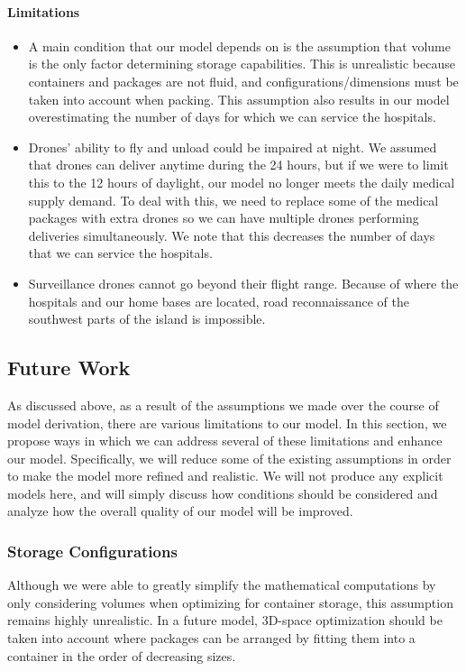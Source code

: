 \paragraph{Limitations}
\begin{itemize}
    \item A main condition that our model depends on is the assumption that volume is the only factor determining storage capabilities. This is unrealistic because containers and packages are not fluid, and configurations/dimensions must be taken into account when packing. This assumption also results in our model overestimating the number of days for which we can service the hospitals. 
    \item Drones' ability to fly and unload could be impaired at night. We assumed that drones can deliver anytime during the 24 hours, but if we were to limit this to the 12 hours of daylight, our model no longer meets the daily medical supply demand. To deal with this, we need to replace some of the medical packages with extra drones so we can have multiple drones performing deliveries simultaneously. We note that this decreases the number of days that we can service the hospitals. 
    \item Surveillance drones cannot go beyond their flight range. Because of where the hospitals and our home bases are located, road reconnaissance of the southwest parts of the island is impossible. 
\end{itemize}


\subsection{Future Work}
As discussed above, as a result of the assumptions we made over the course of model derivation, there are various limitations to our model. In this section, we propose ways in which we can address several of these limitations and enhance our model. Specifically, we will reduce some of the existing assumptions in order to make the model more refined and realistic. We will not produce any explicit models here, and will simply discuss how conditions should be considered and analyze how the overall quality of our model will be improved.

\subsubsection{Storage Configurations}
Although we were able to greatly simplify the mathematical computations by only considering volumes when optimizing for container storage, this assumption remains highly unrealistic. In a future model, 3D-space optimization should be taken into account where packages can be arranged by fitting them into a container in the order of decreasing sizes. 

